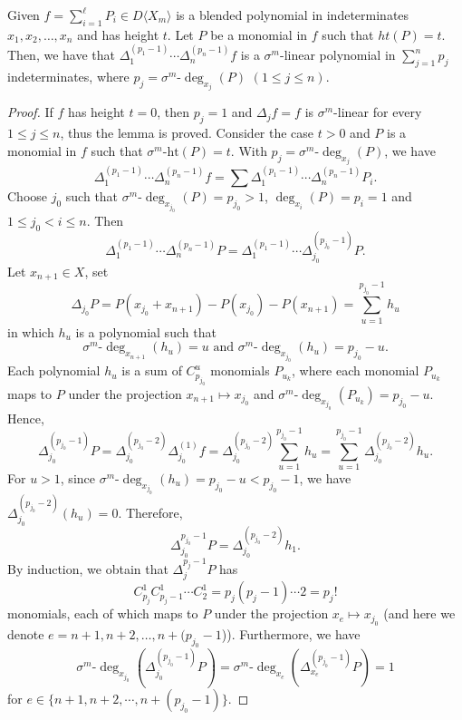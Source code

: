 \documentclass{cimart}
\begin{document}
\begin{lemma} Given $f = \sum_{i=1}^\ell P_i \in D\langle X_m \rangle$ is a blended polynomial in indeterminates $x_1, x_2, \dots, x_n$ and has height $t$. Let $P$ be a monomial in $f$ such that $ht(P) = t$. Then, we have that $\Delta_1^{(p_1-1)}\cdots\Delta_n^{(p_n-1)}f$ is a $\sigma^m$-linear polynomial in $\sum_{j=1}^n p_j$ indeterminates, where $p_j = \sigma^m\text{-}\deg_{x_j}(P)$ $(1 \leq j \leq n)$.
\end{lemma}
\begin{proof}
	If $f$ has height $t=0$, then $p_j=1$ and $\Delta_jf=f$ is $\sigma^m$-linear for every $1\leq j\leq n$, thus the lemma is proved. Consider the case $t>0$ and $P$ is a monomial in $f$ such that $\sigma^m\text{-ht}(P)=t$. With $p_j=\sigma^m\text{-}\deg_{x_j}(P)$, we have
	\[
	\Delta_1^{(p_1-1)}\cdots\Delta_n^{(p_n-1)}f=\sum\Delta_1^{(p_1-1)}\cdots\Delta_n^{(p_n-1)}P_i.
	\]
	Choose $j_0$ such that $\sigma^m\text{-}\deg_{x_{j_0}}(P)=p_{j_0}>1$, $\deg_{x_i}(P)=p_i=1$ and $1\leq j_0<i\leq n$. Then
	\[
	\Delta_1^{(p_1-1)}\cdots\Delta_n^{(p_n-1)}P=\Delta_1^{(p_1-1)}\cdots\Delta_{j_0}^{(p_{j_0}-1)}P.
	\]
	Let $x_{n+1}\in X$, set
	\[
	\Delta_{j_0}P=P(x_{j_0}+x_{n+1})-P(x_{j_0})-P(x_{n+1})=\sum_{u=1}^{p_{j_0}-1}h_u
	\]
	in which $h_u$ is a polynomial such that 			$$\sigma^m\text{-}\deg_{x_{n+1}}(h_u)=u\text{ and } \sigma^m\text{-}\deg_{x_{j_0}}(h_u)=p_{j_{0}}-u.$$
	Each polynomial $h_u$ is a sum of $C_{p_{j_0}}^u$ monomials $P_{u_k}$, where each monomial $P_{u_k}$ maps to $P$ under the projection $x_{n+1}\mapsto x_{j_0}$ and $\sigma^m\text{-}\deg_{x_{j_0}}(P_{u_k})=p_{j_0}-u$.
	Hence,
	\[
	\Delta_{j_0}^{(p_{j_0}-1)}P=\Delta_{j_0}^{(p_{j_0}-2)}\Delta_{j_0}^{(1)}f=\Delta_{j_0}^{(p_{j_0}-2)}\sum_{u=1}^{p_{j_0}-1}h_u=\sum_{u=1}^{p_{j_0}-1}\Delta_{j_0}^{(p_{j_0}-2)}h_u.
	\]
	For $u>1$, since $\sigma^m$-$\deg_{x_{j_0}} (h_u) =p_{j_0}-u<p_{j_0}-1$, we have $\Delta_{{{j_0}}}^{(p_{j_0}-2)}(h_u)=0$. Therefore,
	\[
	\Delta_{{j_0}}^{p_{j_0}-1} P=\Delta^{(p_{j_0}-2)}_{{j_0}}h_1.
	\]
	By induction, we obtain that  $\Delta_{j}^{p_j-1}P$ has
	\[
	C^1_{p_j}C^1_{p_j-1}\cdots C^1_2= p_j(p_j-1)\cdots 2=p_j!
	\]
	monomials, each of which maps to $P$ under the projection $x_{e}\mapsto x_{j_0}$ (and here we denote $e=n+1, n+2, \dots, n+(p_{j_0}-1$)). Furthermore, we have 
	\[
	\sigma^m\text{-}\deg_{x_{j_0}}( \Delta_{j_0}^{(p_{j_0}-1)}P)=\sigma^m\text{-}\deg_{x_{e}} (\Delta_{x_{e}}^{(p_{j_0}-1)}P)=1
	\]
	for $e\in\{n+1, n+2, \cdots, n+(p_{j_0}-1)\}$. 
	

\end{proof}
\end{document}

